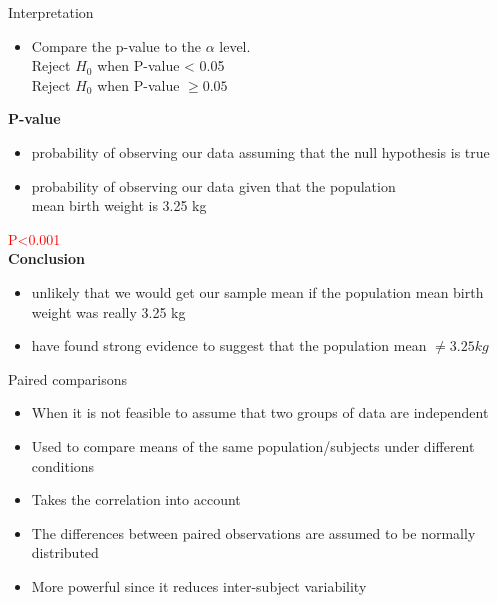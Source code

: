 \documentclass[xcolor=dvipsnames]{beamer}
\begin{document}
\begin{frame}{Interpretation}
\begin{itemize}
\item Compare the p-value to the $\alpha$ level.\\
\hspace{7 mm} Reject $H_0$ when P-value < 0.05\\
\hspace{7 mm} Reject $H_0$ when P-value $\geq 0.05 $\\
\hspace{7 mm}
\end{itemize}

\textbf{P-value} \\
\begin{itemize}
\item  probability of observing our data assuming that the null 
 hypothesis is true \\
\item probability of observing our data given that the population \\ 
mean birth weight is 3.25 kg \\
\end{itemize}
\textcolor{red}{P<0.001} \\
\textbf{Conclusion}
\begin{itemize}
\item unlikely that we would get our sample mean if the population mean birth weight was really 3.25 kg
\item have found strong evidence to suggest that the population mean $\neq 3.25 kg$

\end{itemize}
\end{frame}

\begin{frame}{Paired comparisons}
\begin{itemize}
\item When it is not feasible to assume that two groups of data are independent
\item Used to compare means of the same population/subjects under different conditions
\item Takes the correlation into account
\item The differences between paired observations are assumed to be normally distributed
\item More powerful since it reduces inter-subject variability  
\end{itemize}
\end{frame}
\end{document}

